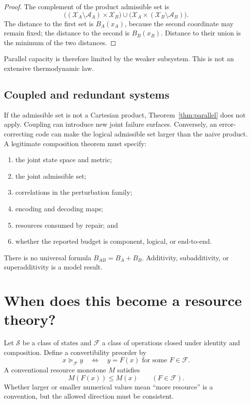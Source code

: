 \documentclass[11pt]{article}
\theoremstyle{definition}
\theoremstyle{remark}
\newcommand{\cA}{\mathcal A}
\newcommand{\cF}{\mathcal F}
\newcommand{\cS}{\mathcal S}
\newcommand{\cX}{\mathcal X}
\begin{document}
\begin{proof}
The complement of the product admissible set is
\[
 \bigl((\cX_A\setminus\cA_A)\times\cX_B\bigr)
 \cup
 \bigl(\cX_A\times(\cX_B\setminus\cA_B)\bigr).
\]
The distance to the first set is \(B_A(x_A)\), because the second coordinate
may remain fixed; the distance to the second is \(B_B(x_B)\).  Distance to
their union is the minimum of the two distances.
\end{proof}

Parallel capacity is therefore limited by the weaker subsystem.  This is
not an extensive thermodynamic law.

\subsection{Coupled and redundant systems}

If the admissible set is not a Cartesian product, Theorem~\ref{thm:parallel}
does not apply.  Coupling can introduce new joint failure surfaces.
Conversely, an error-correcting code can make the logical admissible set
larger than the naive product.  A legitimate composition theorem must
specify:
\begin{enumerate}[leftmargin=2em]
\item the joint state space and metric;
\item the joint admissible set;
\item correlations in the perturbation family;
\item encoding and decoding maps;
\item resources consumed by repair; and
\item whether the reported budget is component, logical, or end-to-end.
\end{enumerate}

There is no universal formula \(B_{AB}=B_A+B_B\).  Additivity, subadditivity,
or superadditivity is a model result.

\section{When does this become a resource theory?}
\label{sec:resource}

Let \(\cS\) be a class of states and \(\cF\) a class of operations closed
under identity and composition.  Define a convertibility preorder by
\[
 x\succeq_{\cF} y
 \quad\Longleftrightarrow\quad
 y=F(x)\text{ for some }F\in\cF.
\]
A conventional resource monotone \(M\) satisfies
\[
 M(F(x))\le M(x)
 \qquad(F\in\cF).
\]
Whether larger or smaller numerical values mean ``more resource'' is a
convention, but the allowed direction must be consistent.
\end{document}
